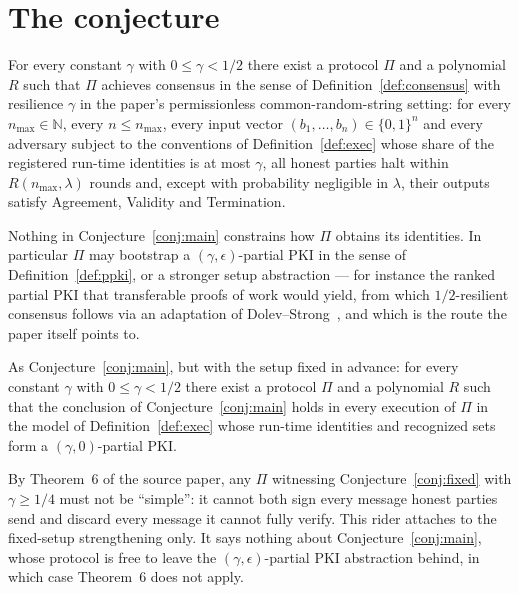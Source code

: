 \documentclass{aicr-conjecture}
\begin{document}
\section{The conjecture}\label{sec:conjectures}

\begin{conjecture}\label{conj:main}
For every constant $\gamma$ with $0 \le \gamma < 1/2$ there exist a
protocol $\Pi$ and a polynomial $R$ such that $\Pi$ achieves consensus
in the sense of Definition~\ref{def:consensus} with resilience $\gamma$
in the paper's permissionless common-random-string setting: for every
$n_{\max} \in \mathbb{N}$, every $n \le n_{\max}$, every input vector
$(b_1,\dots,b_n) \in \{0,1\}^{n}$ and every adversary subject to the
conventions of Definition~\ref{def:exec} whose share of the registered
run-time identities is at most $\gamma$, all honest parties halt within
$R(n_{\max},\lambda)$ rounds and, except with probability negligible in
$\lambda$, their outputs satisfy Agreement, Validity and Termination.
\end{conjecture}

Nothing in Conjecture~\ref{conj:main} constrains how $\Pi$ obtains its
identities. In particular $\Pi$ may bootstrap a
$(\gamma,\epsilon)$-partial PKI in the sense of
Definition~\ref{def:ppki}, or a stronger setup abstraction --- for
instance the ranked partial PKI that transferable proofs of work would
yield, from which $1/2$-resilient consensus follows via an adaptation of
Dolev--Strong~\cite{DS83}, and which is the route the paper itself
points to.

\begin{conjecture}\label{conj:fixed}
As Conjecture~\ref{conj:main}, but with the setup fixed in advance: for
every constant $\gamma$ with $0 \le \gamma < 1/2$ there exist a protocol
$\Pi$ and a polynomial $R$ such that the conclusion of
Conjecture~\ref{conj:main} holds in every execution of $\Pi$ in the
model of Definition~\ref{def:exec} whose run-time identities and
recognized sets form a $(\gamma,0)$-partial PKI.
\end{conjecture}

\begin{remark}
By Theorem~6 of the source paper, any $\Pi$ witnessing
Conjecture~\ref{conj:fixed} with $\gamma \ge 1/4$ must not be
``simple'': it cannot both sign every message honest parties send and
discard every message it cannot fully verify. This rider attaches to the
fixed-setup strengthening only. It says nothing about
Conjecture~\ref{conj:main}, whose protocol is free to leave the
$(\gamma,\epsilon)$-partial PKI abstraction behind, in which case
Theorem~6 does not apply.
\end{remark}
\end{document}
